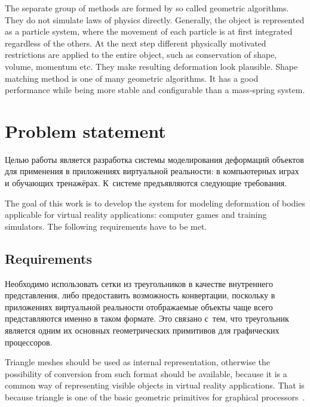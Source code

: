 \documentclass[a4paper, 12pt, titlepage]{extarticle}
\begin{document}
    The separate group of methods are formed by so called geometric algorithms. They do not simulate
    laws of physics directly. Generally, the object is represented as a particle system, where
    the movement of each particle is at first integrated regardless of the others. At the next step
    different physically motivated restrictions are applied to the entire object, such as
    conservation of shape, volume, momentum etc. They make resulting deformation look plausible. Shape
    matching method \cite{mueller-meshless} is one of many geometric algorithms. It has a good
    performance while being more stable and configurable than a mass-spring system.

  \section{Problem statement}\label{sec:task}

\begin{original}
    Целью работы является разработка системы моделирования деформаций объектов для применения в
    приложениях виртуальной реальности: в компьютерных играх и обучающих тренажёрах.
    К~системе предъявляются следующие требования.
\end{original}

    The goal of this work is to develop the system for modeling deformation of bodies applicable for
    virtual reality applications: computer games and training simulators. The following requirements
    have to be met.

    \subsection{Requirements}

\begin{original}
    Необходимо использовать сетки из треугольников в качестве внутреннего представления, либо
    предоставить возможность конвертации, поскольку в приложениях виртуальной реальности отображаемые объекты
    чаще всего представляются именно в таком формате. Это связано с~тем, что треугольник является
    одним их основных геометрических примитивов для графических процессоров.~\cite{nvidia-tutorial}
\end{original}

    Triangle meshes should be used as internal representation, otherwise the possibility of conversion from
    such format should be available, because it is a common way of representing visible objects in
    virtual reality applications. That is because triangle is one of the basic geometric primitives
    for graphical processors~\cite{nvidia-tutorial}.
\end{document}
